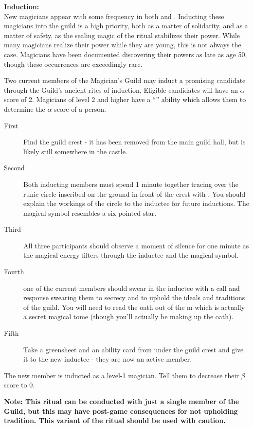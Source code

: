 \documentclass[blue]{NeptuneBall}
\begin{document}
{\bf Induction:}\\
New magicians appear with some frequency in both \pPacifica{} and \pAtlantis{}. Inducting these magicians into the guild is a high priority, both as a matter of solidarity, and as a matter of safety, as the sealing magic of the ritual stabilizes their power. While many magicians realize their power while they are young, this is not always the case. Magicians have been documented discovering their powers as late as age 50, though these occurrences are exceedingly rare.

Two current members of the Magician's Guild may induct a promising candidate through the Guild's ancient rites of induction. Eligible candidates will have an $\alpha$ score of 2. Magicians of level 2 and higher have a ``\aPerceive{}'' ability which allows them to determine the $\alpha$ score of a person.
\begin{description}
\item[First] Find the guild crest - it has been removed from the main guild hall, but is likely still somewhere in the castle. 
\item[Second] Both inducting members must spend 1 minute together tracing over the runic circle inscribed on the ground in front of the crest with \iChalk{}. You should explain the workings of the circle to the inductee for future inductions. The magical symbol resembles a six pointed star. 
\item[Third] All three participants should observe a moment of silence for one minute as the magical energy filters through the inductee and the magical symbol. 
\item[Fourth] one of the current members should swear in the inductee with a call and response swearing them to secrecy and to uphold the ideals and traditions of the guild. You will need to read the oath out of the \iBook{}m which is actually a secret magical tome (though you'll actually be making up the oath). 
\item[Fifth] Take a greensheet and an ability card from under the guild crest and give it to the new inductee - they are now an active member.
\end{description}

The new member is inducted as a level-1 magician. Tell them to decrease their $\beta$ score to 0.

{\bf Note: This ritual can be conducted with just a single member of the Guild, but this may have post-game consequences for not upholding tradition. This variant of the ritual should be used with caution.}
\end{document}
